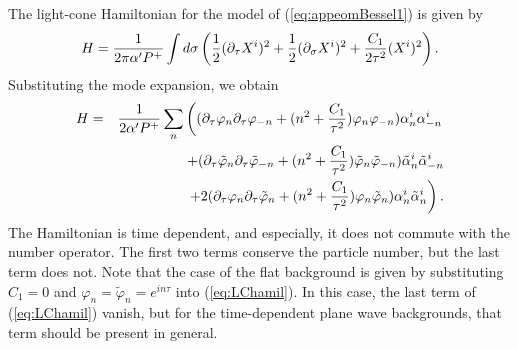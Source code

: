 \documentclass[a4paper,12pt]{article}
\begin{document}
The light-cone Hamiltonian for the model of 
(\ref{eq:appeomBessel1}) is given by
\begin{equation}
H={1\over 2\pi\alpha'P^{+}}\int d\sigma
\left( {1\over 2}(\partial_{\tau}X^{i})^2 
+{1\over 2}(\partial_{\sigma}X^{i})^2
+{C_{1}\over 2\tau^2}(X^{i})^2\right).
\end{equation}
Substituting the mode expansion, we obtain
\begin{eqnarray}
H&=&{1\over 2\alpha'P^{+}}
\sum_{n}\left( (\partial_{\tau}\varphi_{n}
\partial_{\tau}\varphi_{-n} +(n^2+{C_{1}\over \tau^2})
\varphi_{n}\varphi_{-n}) \alpha^{i}_{n}\alpha^{i}_{-n}\right.
\nonumber\\
&&\qquad\qquad +(\partial_{\tau}\tilde{\varphi}_{n}
\partial_{\tau}\tilde{\varphi}_{-n} +(n^2+{C_{1}\over \tau^2})
\tilde{\varphi}_{n}\tilde{\varphi}_{-n}) 
\tilde{\alpha}^{i}_{n}\tilde{\alpha}^{i}_{-n}\nonumber\\
&&\qquad\qquad \left. +2(\partial_{\tau}\varphi_{n}
\partial_{\tau}\tilde{\varphi}_{n} +(n^2+{C_{1}\over \tau^2})
\varphi_{n}\tilde{\varphi}_{n}) 
\alpha^{i}_{n}\tilde{\alpha}^{i}_{n} \right).
\label{eq:LChamil}
\end{eqnarray}
The Hamiltonian is time dependent, and especially,
it does not commute with the number operator.
The first two terms conserve the particle number,
but the last term does not.
Note that the case of the flat background is given by
substituting $C_{1}=0$ and 
$\varphi_{n}=\tilde{\varphi}_{n}=e^{in\tau}$ into 
(\ref{eq:LChamil}). In this case, the last term 
of (\ref{eq:LChamil}) vanish,
but for the time-dependent plane wave backgrounds,
that term should be present in general. 
\end{document}
